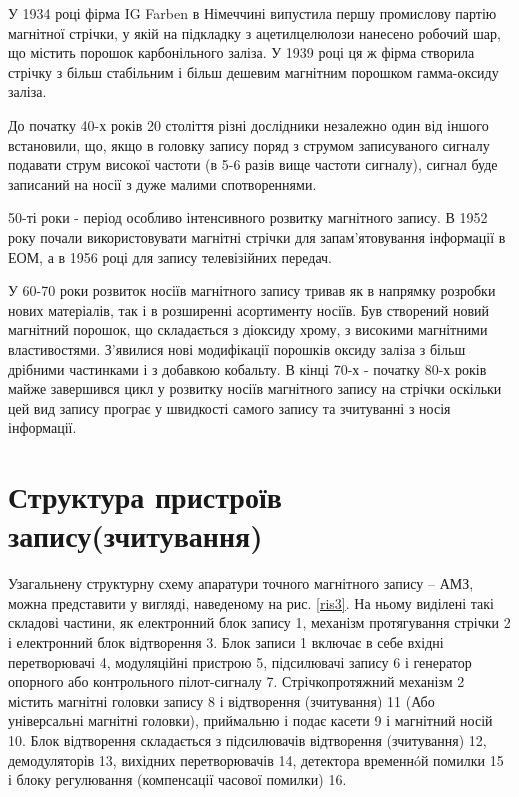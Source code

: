 \documentclass[a4paper,14pt]{extreport}
\begin{document}
  У 1934 році фірма IG Farben в Німеччині випустила першу промислову партію магнітної стрічки, у якій на підкладку з
  ацетилцелюлози нанесено робочий шар, що містить порошок карбонільного заліза. У 1939 році ця ж фірма створила стрічку з більш стабільним і більш дешевим магнітним порошком гамма-оксиду заліза.\par

  До початку 40-х років 20 століття різні дослідники незалежно один від іншого встановили, що, якщо в головку запису поряд з струмом записуваного сигналу подавати струм високої частоти (в 5-6 разів вище частоти сигналу), сигнал буде записаний на носії з дуже малими спотвореннями.\par 

  50-ті роки - період особливо інтенсивного розвитку магнітного запису. В 1952 року почали використовувати магнітні стрічки для запам'ятовування інформації в ЕОМ, а в 1956 році для запису телевізійних передач.\par

  У 60-70 роки розвиток носіїв магнітного запису тривав як в
  напрямку розробки нових матеріалів, так і в розширенні асортименту
  носіїв. Був створений новий магнітний порошок, що складається з діоксиду хрому, з високими магнітними властивостями. З'явилися нові модифікації порошків оксиду заліза з більш дрібними частинками і з добавкою кобальту. В кінці 70-х - початку 80-х років майже завершився цикл у розвитку носіїв магнітного запису на стрічки оскільки цей вид запису програє у швидкості самого запису та зчитуванні з носія інформації.

\chapter{Структура пристроїв запису(зчитування)}\par
  Узагальнену структурну схему апаратури точного магнітного запису -- АМЗ, можна представити у вигляді, наведеному на рис. \ref{ris3}.
  На ньому виділені такі складові частини, як електронний блок запису 1, механізм протягування стрічки 2 і електронний блок відтворення 3. Блок записи 1 включає в себе вхідні перетворювачі 4, модуляційні пристрою 5, підсилювачі запису 6 і генератор опорного
  або контрольного пілот-сигналу 7. Стрічкопротяжний механізм 2 містить магнітні головки запису 8 і відтворення (зчитування) 11
  (Або універсальні магнітні головки), приймальню і подає касети 9 і магнітний носій 10. Блок відтворення складається з підсилювачів відтворення (зчитування) 12, демодуляторів 13, вихідних
  перетворювачів 14, детектора временнóй помилки 15 і блоку регулювання (компенсації часової помилки) 16.\par
\end{document}
